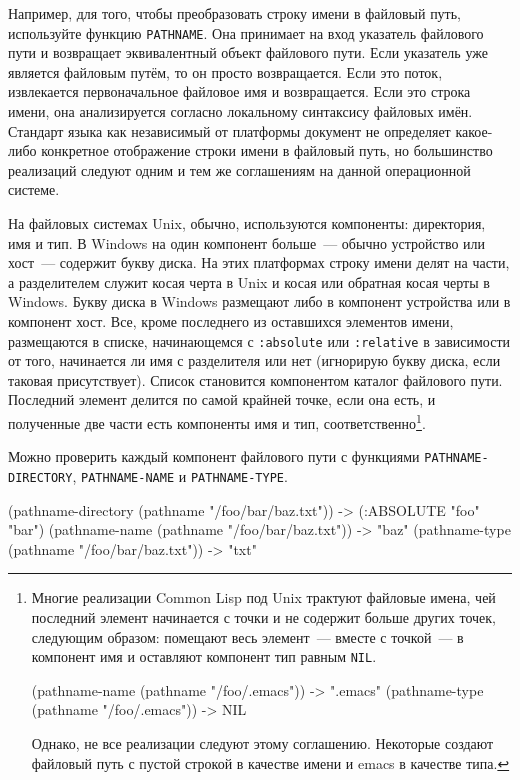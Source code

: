 Например, для того, чтобы преобразовать строку имени в файловый путь, используйте функцию
\lstinline{PATHNAME}. Она принимает на вход указатель файлового пути и возвращает эквивалентный
объект файлового пути. Если указатель уже является файловым путём, то он просто
возвращается. Если это поток, извлекается первоначальное файловое имя и возвращается. Если
это строка имени, она анализируется согласно локальному синтаксису файловых имён. Стандарт
языка как независимый от платформы документ не определяет какое-либо конкретное
отображение строки имени в файловый путь, но большинство реализаций следуют одним и тем же
соглашениям на данной операционной системе.

На файловых системах Unix, обычно, используются компоненты: директория, имя и тип. В
Windows на один компонент больше~--- обычно устройство или хост~--- содержит букву диска. На
этих платформах строку имени делят на части, а разделителем служит косая черта в Unix и
косая или обратная косая черты в Windows. Букву диска в Windows размещают либо в компонент
устройства или в компонент хост. Все, кроме последнего из оставшихся элементов имени,
размещаются в списке, начинающемся с \lstinline{:absolute} или \lstinline{:relative} в зависимости
от того, начинается ли имя с разделителя или нет (игнорирую букву диска, если таковая
присутствует). Список становится компонентом каталог файлового пути. Последний элемент
делится по самой крайней точке, если она есть, и полученные две части есть компоненты имя
и тип, соответственно\footnote{Многие реализации Common Lisp под Unix трактуют файловые
  имена, чей последний элемент начинается с точки и не содержит больше других точек,
  следующим образом: помещают весь элемент~--- вместе с точкой~--- в компонент имя и
  оставляют компонент тип равным \lstinline{NIL}.

\begin{myverb}
(pathname-name (pathname "/foo/.emacs")) -> ".emacs" 
(pathname-type (pathname "/foo/.emacs")) -> NIL 
\end{myverb}

Однако, не все реализации следуют этому соглашению. Некоторые создают файловый путь с
пустой строкой в качестве имени и emacs в качестве типа.}\hspace{\footnotenegspace}.

Можно проверить каждый компонент файлового пути с функциями \lstinline{PATHNAME-DIRECTORY},
\lstinline{PATHNAME-NAME} и \lstinline{PATHNAME-TYPE}.

\begin{myverb}
(pathname-directory (pathname "/foo/bar/baz.txt")) -> (:ABSOLUTE "foo" "bar") 
(pathname-name (pathname "/foo/bar/baz.txt"))      -> "baz" 
(pathname-type (pathname "/foo/bar/baz.txt"))      -> "txt" 
\end{myverb}

